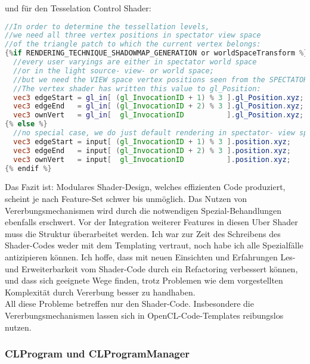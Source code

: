 	und für den Tesselation Control Shader:
	
	\begin{lstlisting}[language=GLSL]
//In order to determine the tessellation levels,
//we need all three vertex positions in spectator view space 
//of the triangle patch to which the current vertex belongs:
{%if RENDERING_TECHNIQUE_SHADOWMAP_GENERATION or worldSpaceTransform %}
  //every user varyings are either in spectator world space
  //or in the light source- view- or world space;
  //but we need the VIEW space vertex positions seen from the SPECTATOR camera for the tessellation level calculations!
  //The vertex shader has written this value to gl_Position:
  vec3 edgeStart = gl_in[ (gl_InvocationID + 1) % 3 ].gl_Position.xyz;
  vec3 edgeEnd   = gl_in[ (gl_InvocationID + 2) % 3 ].gl_Position.xyz;
  vec3 ownVert   = gl_in[  gl_InvocationID          ].gl_Position.xyz;
{% else %}
  //no special case, we do just default rendering in spectator- view space; So grab the default position value:
  vec3 edgeStart = input[ (gl_InvocationID + 1) % 3 ].position.xyz;
  vec3 edgeEnd   = input[ (gl_InvocationID + 2) % 3 ].position.xyz;
  vec3 ownVert   = input[  gl_InvocationID          ].position.xyz;  
{% endif %}  
	\end{lstlisting}
	
	
	Das Fazit ist: Modulares Shader-Design, welches effizienten Code produziert, scheint je nach Feature-Set
	schwer bis unmöglich. Das Nutzen von Vererbungsmechanismen wird durch die notwendigen Spezial-Behandlungen 
	ebenfalls erschwert.
	Vor der Integration weiterer Features in diesen Uber Shader muss die Struktur überarbeitet werden.
	Ich war zur Zeit des Schreibens des Shader-Codes weder mit dem Templating vertraut, noch habe ich alle Spezialfälle
	antizipieren können. Ich hoffe, dass mit neuen Einsichten und Erfahrungen Les- und Erweiterbarkeit
	vom Shader-Code durch ein Refactoring verbessert können, und dass sich geeignete Wege finden, trotz Problemen wie dem
	vorgestellten Komplexität durch Vererbung besser zu handhaben.\\
	All diese Probleme betreffen nur den Shader-Code. Insbesondere die Vererbungsmechanismen
	lassen sich in OpenCL-Code-Templates reibungslos nutzen.


		
	\subsubsection{CLProgram und CLProgramManager}
	\label{sec:CLProgram}
	
